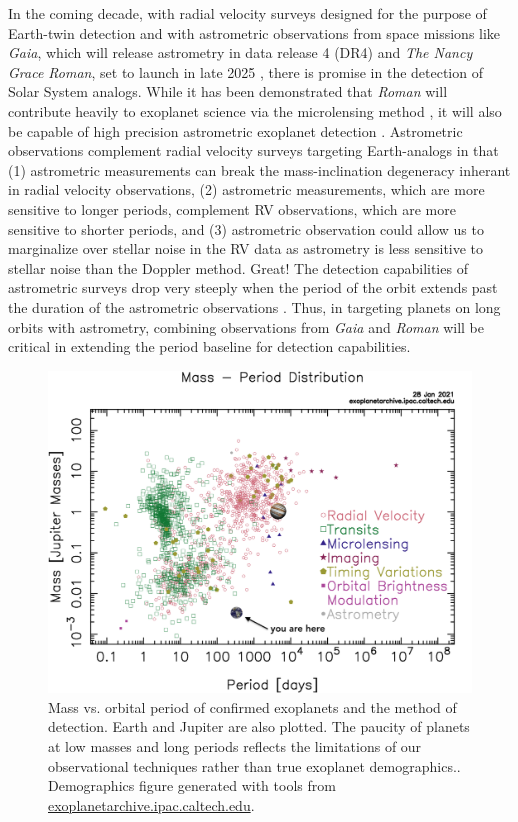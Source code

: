 \documentclass[twocolumn]{aastex631}
\newcommand{\racomment}[1]{{\color{blue}#1}}
\begin{document}
In the coming decade, with radial velocity surveys designed for the purpose of Earth-twin detection \citep{Hall2018} and with astrometric observations from space missions like \textit{Gaia}, which will release astrometry in data release 4 (DR4) \citep{Gaia2016} and \textit{The Nancy Grace Roman}, set to launch in late 2025 \citep{Spergel2015}, there is promise in the detection of Solar System analogs. While it has been demonstrated that \textit{Roman} will contribute heavily to exoplanet science via the microlensing method \citep{Penny2019, Johnson2020}, it will also be capable of high precision astrometric exoplanet detection \citep{Sanderson2019}. Astrometric observations complement radial velocity surveys targeting Earth-analogs in that (1) astrometric measurements can break the mass-inclination degeneracy inherant in radial velocity observations, (2) astrometric measurements, which are more sensitive to longer periods, complement RV observations, which are more sensitive to shorter periods, and (3) astrometric observation could allow us to marginalize over stellar noise in the RV data as astrometry is less sensitive to stellar noise than the Doppler method.
\racomment{Great!}
The detection capabilities of astrometric surveys drop very steeply when the period of the orbit extends past the duration of the astrometric observations \citep{Casertano2008}. Thus, in targeting planets on long orbits with astrometry, combining observations from \textit{Gaia} and \textit{Roman} will be critical in extending the period baseline for detection capabilities. 

\begin{figure}[htb] \label{fig: demographics}
    \centering 
    \includegraphics[width=\columnwidth]{exo_massperiod_wEarthJupiter.png}
    \caption{Mass vs. \racomment{orbital} period of confirmed exoplanets and the method of detection. Earth and Jupiter are also plotted. The paucity of planets at low masses and long periods reflects the limitations of our observational techniques rather than true exoplanet demographics.. Demographics figure generated with tools from \href{exoplanetarchive.ipac.caltech.edu}{exoplanetarchive.ipac.caltech.edu}.}
\end{figure}
\end{document}
